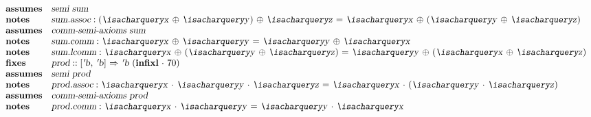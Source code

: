\begin{isabellebody}
\begin{isamarkuptext}
\[\begin{array}{ll}
  \textbf{assumes} & \isa{{\isachardoublequote}semi\ sum{\isachardoublequote}} \\
  \textbf{notes} & \isa{sum{\isachardot}assoc}: \isa{{\isachardoublequote}{\isacharparenleft}{\isacharquery}x\ {\isasymoplus}\ {\isacharquery}y{\isacharparenright}\ {\isasymoplus}\ {\isacharquery}z\ {\isacharequal}\ {\isacharquery}x\ {\isasymoplus}\ {\isacharparenleft}{\isacharquery}y\ {\isasymoplus}\ {\isacharquery}z{\isacharparenright}{\isachardoublequote}} \\
  \textbf{assumes} & \isa{{\isachardoublequote}comm{\isacharunderscore}semi{\isacharunderscore}axioms\ sum{\isachardoublequote}} \\
  \textbf{notes} & \isa{sum{\isachardot}comm}: \isa{{\isachardoublequote}{\isacharquery}x\ {\isasymoplus}\ {\isacharquery}y\ {\isacharequal}\ {\isacharquery}y\ {\isasymoplus}\ {\isacharquery}x{\isachardoublequote}} \\
  \textbf{notes} & \isa{sum{\isachardot}lcomm}: \isa{{\isachardoublequote}{\isacharquery}x\ {\isasymoplus}\ {\isacharparenleft}{\isacharquery}y\ {\isasymoplus}\ {\isacharquery}z{\isacharparenright}\ {\isacharequal}\ {\isacharquery}y\ {\isasymoplus}\ {\isacharparenleft}{\isacharquery}x\ {\isasymoplus}\ {\isacharquery}z{\isacharparenright}{\isachardoublequote}} \\
  \textbf{fixes} & \isa{prod} :: \isa{{\isachardoublequote}{\isacharbrackleft}{\isacharprime}b{\isacharcomma}\ {\isacharprime}b{\isacharbrackright}\ {\isasymRightarrow}\ {\isacharprime}b{\isachardoublequote}}
    ~(\textbf{infixl}~\isa{{\isachardoublequote}{\isasymcdot}{\isachardoublequote}}~70) \\
  \textbf{assumes} & \isa{{\isachardoublequote}semi\ prod{\isachardoublequote}} \\
  \textbf{notes} & \isa{prod{\isachardot}assoc}: \isa{{\isachardoublequote}{\isacharquery}x\ {\isasymcdot}\ {\isacharquery}y\ {\isasymcdot}\ {\isacharquery}z\ {\isacharequal}\ {\isacharquery}x\ {\isasymcdot}\ {\isacharparenleft}{\isacharquery}y\ {\isasymcdot}\ {\isacharquery}z{\isacharparenright}{\isachardoublequote}} \\
  \textbf{assumes} & \isa{{\isachardoublequote}comm{\isacharunderscore}semi{\isacharunderscore}axioms\ prod{\isachardoublequote}} \\
  \textbf{notes} & \isa{prod{\isachardot}comm}: \isa{{\isachardoublequote}{\isacharquery}x\ {\isasymcdot}\ {\isacharquery}y\ {\isacharequal}\ {\isacharquery}y\ {\isasymcdot}\ {\isacharquery}x{\isachardoublequote}} \\

\end{array}\]
\end{isamarkuptext}
\end{isabellebody}
